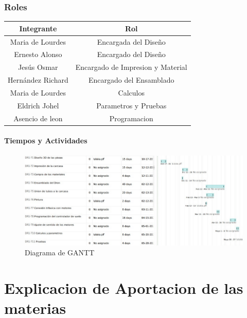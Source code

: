 \documentclass[11pt,a4paper]{article}
\begin{document}
\section{Roles}

\begin{tabular}{|c|c|}

\hline
\textbf{Integrante} & \textbf{Rol} \\ \hline
Maria de Lourdes  & Encargada del Diseño \\ \hline
Ernesto Alonso & Encargado del Diseño \\ \hline
Jesús Osmar & Encargado de Impresion y Material \\ \hline
Hernández Richard & Encargado del Ensamblado \\ \hline
Maria de Lourdes & Calculos \\ \hline
Eldrich Johel & Parametros y Pruebas \\ \hline
Asencio de leon & Programacion \\ \hline
\end{tabular}

\subsection{Tiempos y Actividades}

\begin{figure}[h]
\centering
\includegraphics[scale=.5]{FFFFFFFFFF2}
\caption{Diagrama de GANTT}
\end{figure}


\newpage

\part{Explicacion de Aportacion de las materias}
\end{document}
